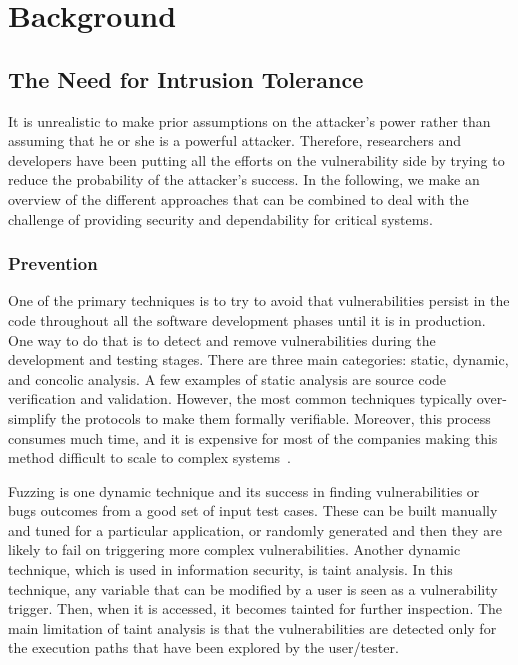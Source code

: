 \chapter{Background}
\label{chap:related_work}


\section{The Need for Intrusion Tolerance}

It is unrealistic to make prior assumptions on the attacker's power rather than assuming that he or she is a powerful attacker.
Therefore, researchers and developers have been putting all the efforts on the vulnerability side by trying to reduce the probability of the attacker's success. 
In the following, we make an overview of the different approaches that can be combined to deal with the challenge of providing security and dependability for critical systems.

\subsection{Prevention}
One of the primary techniques is to try to avoid that vulnerabilities persist in the code throughout all the software development phases until it is in production. 
One way to do that is to detect and remove vulnerabilities during the development and testing stages.
There are three main categories: static, dynamic, and concolic analysis.
A few examples of static analysis are source code verification and validation. 
However, the most common techniques typically over-simplify the protocols to make them formally verifiable. 
Moreover, this process consumes much time, and it is expensive for most of the companies making this method difficult to scale to complex systems~\cite{Giuffrida:2013}.

Fuzzing is one dynamic technique and its success in finding vulnerabilities or bugs outcomes from a good set of input test cases.
These can be built manually and tuned for a particular application, or randomly generated and then they are likely to fail on triggering more complex vulnerabilities.
Another dynamic technique, which is used in information security, is taint analysis.
In this technique, any variable that can be modified by a user is seen as a vulnerability trigger. 
Then, when it is accessed, it becomes tainted for further inspection.
The main limitation of taint analysis is that the vulnerabilities are detected only for the execution paths that have been explored by the user/tester.

